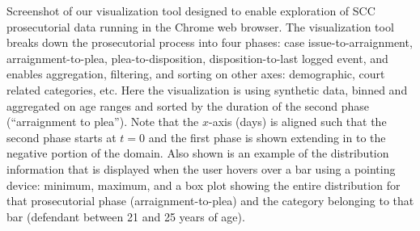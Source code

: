 Screenshot of our visualization tool designed to enable exploration of SCC prosecutorial data running in the Chrome web browser. The visualization tool breaks down the prosecutorial process into four phases: case issue-to-arraignment, arraignment-to-plea, plea-to-disposition, disposition-to-last logged event, and enables aggregation, filtering, and sorting on other axes: demographic, court related categories, etc. Here the visualization is using synthetic data, binned and aggregated on age ranges and sorted by the duration of the second phase (``arraignment to plea''). Note that the $x$-axis (days) is aligned such that the second phase starts at $t = 0$ and the first phase is shown extending in to the negative portion of the domain. Also shown is an example of the distribution information that is displayed when the user hovers over a bar using a pointing device: minimum, maximum, and a box plot showing the entire distribution for that prosecutorial phase (arraignment-to-plea) and the category belonging to that bar (defendant between 21 and 25 years of age).
\label{fig:sshot}